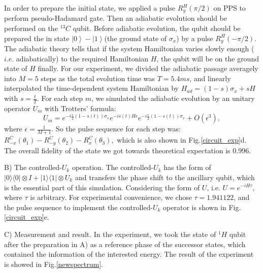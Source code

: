 \documentclass[twocolumn,showpacs,twoside,10pt,superscriptaddress,prl]{revtex4}
\begin{document}
In order to prepare the initial state, we applied a pulse $R_{y}^{H}
(\pi/2)$ on PPS to perform pseudo-Hadamard gate. Then an adiabatic
evolution should be performed on the $^{13}C$ qubit. Before
adiabatic evolution, the qubit should be prepared the in state
$\left\vert 0\right\rangle-\left\vert 1\right\rangle$(the ground
state of $\sigma_x$) by a pulse $R_{y}^{H} (-\pi/2)$. The adiabatic
theory tells that if the system Hamiltonian varies slowly enough
($i.e.$ adiabatically) to the required Hamiltonian $H$, the qubit
will be on the ground state of $H$ finally. For our experiment, we
divided the adiabatic passage averagely into $M=5$ steps as the
total evolution time was $T=5.4ms$, and linearly interpolated the
time-dependent system Hamiltonian by $H_{ad}=(1-s)\sigma_x + sH$
with $s=\frac{t}{T}$. For each step $m$, we simulated the adiabatic
evolution by an unitary operator $U_m$ with Trotters' formula:
\begin{equation}
U_{m}=e^{-i\frac{\epsilon}{2}(1-s(t))\sigma_{x}}e^{-is(t)H\epsilon}
e^{-i\frac{\epsilon}{2}(1-s(t))\sigma_{x} }+O(\epsilon^{3}),
\end{equation}
where $\epsilon = \frac{1}{M+1}$. So the pulse sequence for each
step was:
$R_{-x}^{C}(\theta_{1})-R_{-y}^{C}(\theta_{2})-R_{x}^{C}(\theta_{3}),$
which is also shown in Fig.\ref{circuit_exp}d. The overall fidelity
of the state we got towards theoretical expectation is 0.996.







B) The controlled-$U_k$ operation. The controlled-$U_k$ has the form
of $|0\rangle\langle0|\otimes I +|1\rangle\langle1|\otimes U_k $ and
transfers the phase shift to the ancillary qubit, which is the
essential part of this simulation. Considering the form of $U$, i.e.
$U= e^{-iH\tau}$, where $\tau$ is arbitrary. For experimental
convenience, we chose $\tau=1.941122$, and the pulse sequence to
implement the controlled-$U_k$ operator is shown in
Fig.\ref{circuit_exp}e.



C) Measurement and result.  In the experiment, we took the state of
$^1H$ qubit after the preparation in A) as a reference phase of the
successor states, which contained the information of the interested
energy. The result of the experiment is showed in
Fig.\ref{newspectrum}.
\end{document}
